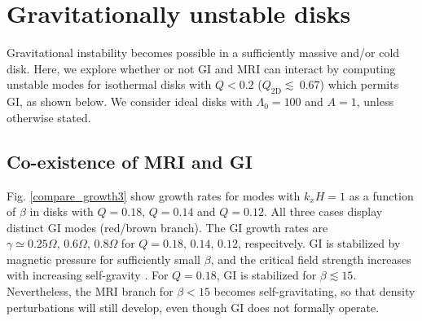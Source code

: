 \section{Gravitationally unstable disks} \label{result2}
Gravitational instability becomes possible in a sufficiently
massive and/or cold disk. Here, we explore whether or not GI and MRI
can interact by computing unstable modes for isothermal disks with $Q < 0.2 $
($Q_\mathrm{2D}\lesssim ~0.67$) which permits GI, as shown below.
We consider ideal disks with $\Lambda_0=100$ and $A=1$, unless
otherwise stated.  

\subsection{Co-existence of MRI and GI} 
Fig. \ref{compare_growth3} show growth rates for modes with $k_xH=1$
as a function of $\beta$ in disks with $Q=0.18$, $Q=0.14$ and
$Q=0.12$.   
All three cases display distinct GI modes (red/brown branch). The GI 
growth rates are $\gamma\simeq 0.25\Omega,\,0.6\Omega,\,0.8\Omega$ for
$Q=0.18,\,0.14,\,0.12$, respecitvely. GI is stabilized by magnetic
pressure for sufficiently small $\beta$, and the critical
field strength increases with increasing self-gravity \citep{nakamura83}. 
For $Q=0.18$, GI is stabilized for $\beta \lesssim 15$. Nevertheless, 
the MRI branch for $\beta < 15$ becomes self-gravitating, so that
density perturbations will still develop, even though GI does not
formally operate.  


